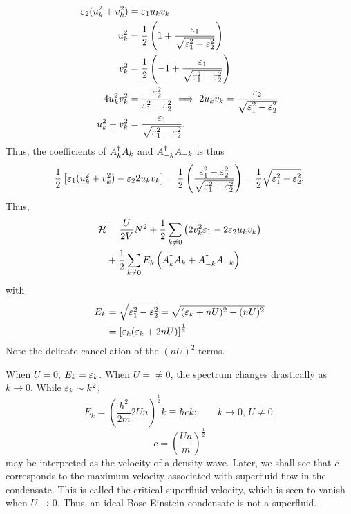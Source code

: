 \begin{align*}
	\varepsilon_2(u_k^2 + v_k^2) &= \varepsilon_1u_kv_k \\
	u_k^2 &= \frac{1}{2}\left (1 +\frac{\varepsilon_1}{\sqrt{\varepsilon_1^2-\varepsilon_2^2}}\right ) \\
	v_k^2 &= \frac{1}{2}\left (-1 +\frac{\varepsilon_1}{\sqrt{\varepsilon_1^2-\varepsilon_2^2}}\right )  \\
	4u_k^2v_k^2 &= \frac{\varepsilon_2^2}{\varepsilon_1^2-\varepsilon_2^2} \implies
	2u_kv_k = \frac{\varepsilon_2}{\sqrt{\varepsilon_1^2-\varepsilon_2^2}} \\
	u_k^2 + v_k^2 &= \frac{\varepsilon_1}{\sqrt{\varepsilon_1^2-\varepsilon_2^2}}.
\end{align*}
Thus, the coefficients of $A_{k}^{\dagger}A_{k}$ and  $A_{-k}^{\dagger}A_{-k}$ is thus 
\begin{equation}
	\frac{1}{2}\left [\varepsilon_1(u_k^2 + v_k^2) -\varepsilon_2 2u_kv_k\right ] = \frac{1}{2}\left (\frac{\varepsilon_1^2-\varepsilon_2^2}{\sqrt{\varepsilon_1^2-\varepsilon_2^2}}\right ) = \frac{1}{2}\sqrt{\varepsilon_1^2-\varepsilon_2^2}.
\end{equation}
Thus,
\begin{equation}
	\begin{aligned}
		\mathcal{H} &= \frac{U}{2V}N^2 + \frac{1}{2}\sum_{k\ne0}\left (2v_k^2\varepsilon_1 - 2\varepsilon_2 u_kv_k\right ) \\
		&+ \frac{1}{2}\sum_{k\ne0}E_k\left (A_{k}^{\dagger}A_{k} + A_{-k}^{\dagger}A_{-k}\right )
	\end{aligned}
\end{equation}
with
\begin{equation}
	\begin{aligned}
	E_k &= \sqrt{\varepsilon_1^2-\varepsilon_2^2} = \sqrt{(\varepsilon_k + nU)^2-(nU)^2} \\
	&= \left [\varepsilon_k(\varepsilon_k + 2nU)\right ]^{\frac{1}{2}}
	\end{aligned}
\end{equation}
Note the delicate cancellation of the $(nU)^2$-terms.

When $U=0$, $E_k=\varepsilon_k$. 
When $U=\ne0$, the spectrum changes drastically as $k\rightarrow0$.
While $\varepsilon_k \sim k^2$, 
\begin{equation}
	E_k = \left (\frac{\hbar^2}{2m}2Un\right )^{\frac{1}{2}}k \equiv \hbar ck; \qquad k\rightarrow 0,\, U\ne0 .
\end{equation}
\begin{equation}
	c = \left (\frac{Un}{m}\right )^{\frac{1}{2}}
\end{equation}
may be interpreted as the velocity of a density-wave. Later, we shall see that $c$ corresponds to the maximum velocity associated with superfluid flow in the condensate. This is called the critical superfluid velocity, which is seen to vanish when $U\rightarrow0$. Thus, an ideal Bose-Einstein condensate is not a superfluid. 


